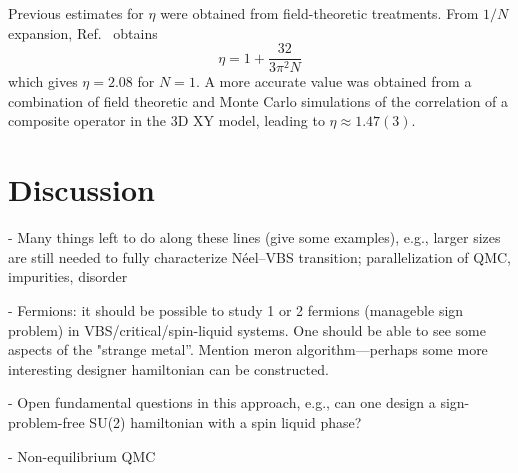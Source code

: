 \documentclass[range]{ar2e}
\begin{document}
Previous estimates for $\eta$ were obtained from field-theoretic treatments.  From $1/N$ expansion, Ref.~\cite{XYstar2} obtains
\begin{equation}
\eta = 1 + \frac{32}{3 \pi^2 N}
\end{equation}
which gives $\eta = 2.08$ for $N=1$.
A more accurate value was obtained from a combination of field theoretic and Monte Carlo simulations of the correlation of a composite operator in the 3D XY model\cite{compositefieldtheory,compositeMC}, leading to $\eta\approx  1.47(3)$.





\section{Discussion}
\label{sec:discussion}

- Many things left to do along these lines (give some examples), e.g., larger sizes are still needed
to fully characterize N\'eel--VBS transition; parallelization of QMC, impurities, disorder

- Fermions: it should be possible to study 1 or 2 fermions (manageble sign problem) in 
VBS/critical/spin-liquid systems. One should be able to see some aspects of the "strange metal''.
Mention meron algorithm---perhaps some more interesting designer hamiltonian can be constructed.

- Open fundamental questions in this approach, e.g., can one design a sign-problem-free
  SU(2) hamiltonian with a spin liquid phase?

- Non-equilibrium QMC
\end{document}
